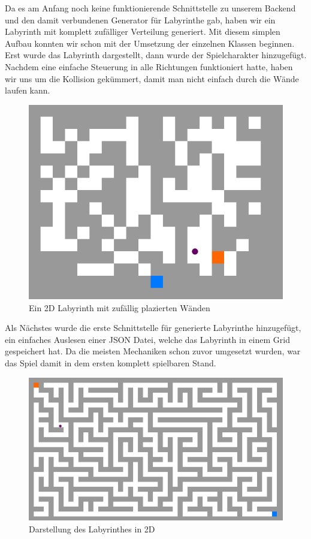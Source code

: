 Da es am Anfang noch keine funktionierende Schnittstelle zu unserem Backend und den damit verbundenen Generator für Labyrinthe gab, haben wir ein Labyrinth mit komplett zufälliger Verteilung generiert.
Mit diesem simplen Aufbau konnten wir schon mit der Umsetzung der einzelnen Klassen beginnen. Erst wurde das Labyrinth dargestellt, dann wurde der Spielcharakter hinzugefügt. Nachdem eine einfache Steuerung in alle Richtungen funktioniert hatte, haben wir uns um die Kollision gekümmert, damit man nicht einfach durch die Wände laufen kann.
\begin{figure}[h]
    \centering
    \includegraphics[width=\paperwidth-6in]{../assets/img/Fr2DTopDownRandom.PNG}
    \caption{Ein 2D Labyrinth mit zufällig plazierten Wänden}
    \label{fig:TopDown}
\end{figure}
Als Nächstes wurde die erste Schnittstelle für generierte Labyrinthe hinzugefügt, ein einfaches Auslesen einer JSON Datei, welche das Labyrinth in einem Grid gespeichert hat.
Da die meisten Mechaniken schon zuvor umgesetzt wurden, war das Spiel damit in dem ersten komplett spielbaren Stand.
\begin{figure}[h]
    \centering
    \includegraphics[width=\paperwidth-3in]{../assets/img/Fr2DTopDown.PNG}
    \caption{Darstellung des Labyrinthes in 2D}
    \label{fig:git-flow}
\end{figure}

